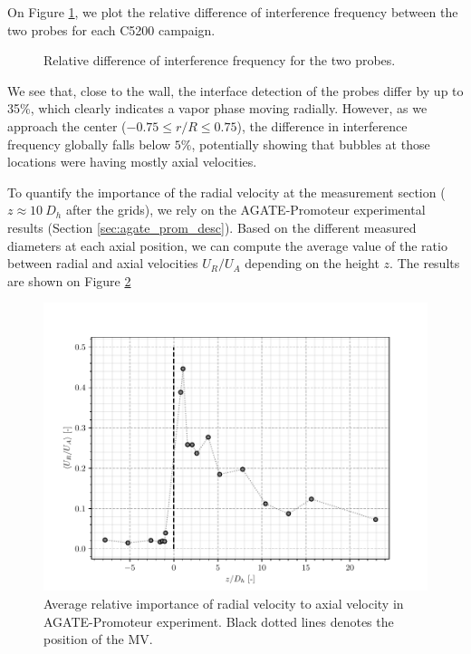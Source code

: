 On Figure \ref{fig:exp_C52_deltanu}, we plot the relative difference of interference frequency between the two probes for each C5200 campaign. 


\begin{figure}[!h]
\centering
{}

\caption{Relative difference of interference frequency for the two probes.}
\label{fig:exp_C52_deltanu}
\end{figure}


\npar


We see that, close to the wall, the interface detection of the probes differ by up to 35\%, which clearly indicates a vapor phase moving radially. However, as we approach the center ($-0.75 \leq r/R \leq 0.75$), the difference in interference frequency globally falls below $5\%$, potentially showing that bubbles at those locations were having mostly axial velocities.

\npar

To quantify the importance of the radial velocity at the measurement section ($z\approx 10\ D_{h}$ after the grids), we rely on the AGATE-Promoteur experimental results (Section \ref{sec:agate_prom_desc}). Based on the different measured diameters at each axial position, we can compute the average value of the ratio between radial and axial velocities $U_{R} / U_{A}$ depending on the height $z$. The results are shown on Figure \ref{fig:exp_agate_Urap_z}


\begin{figure}[!h]
\centering
\includegraphics[width=0.6\linewidth]{img/AGATE/Urap_z.pdf}
\caption{Average relative importance of radial velocity to axial velocity in AGATE-Promoteur experiment. Black dotted lines denotes the position of the MV.}
\label{fig:exp_agate_Urap_z}
\end{figure}


